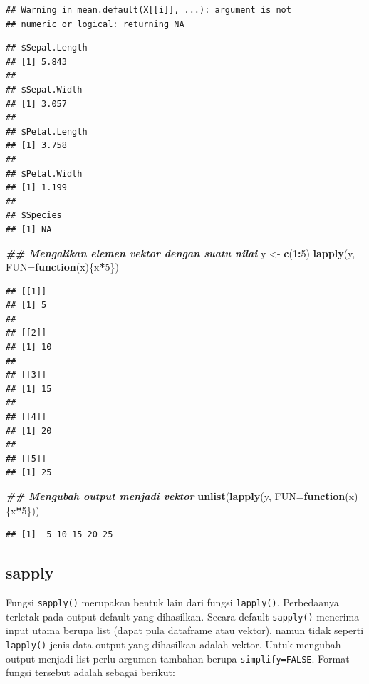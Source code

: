 \documentclass[
]{book}
\newenvironment{Shaded}{\begin{snugshade}}{\end{snugshade}}
\newcommand{\AttributeTok}[1]{\textcolor[rgb]{0.13,0.29,0.53}{#1}}
\newcommand{\ControlFlowTok}[1]{\textcolor[rgb]{0.13,0.29,0.53}{\textbf{#1}}}
\newcommand{\DecValTok}[1]{\textcolor[rgb]{0.00,0.00,0.81}{#1}}
\newcommand{\DocumentationTok}[1]{\textcolor[rgb]{0.56,0.35,0.01}{\textbf{\textit{#1}}}}
\newcommand{\FunctionTok}[1]{\textcolor[rgb]{0.13,0.29,0.53}{\textbf{#1}}}
\newcommand{\NormalTok}[1]{#1}
\newcommand{\OtherTok}[1]{\textcolor[rgb]{0.56,0.35,0.01}{#1}}
\newcommand{\SpecialCharTok}[1]{\textcolor[rgb]{0.81,0.36,0.00}{\textbf{#1}}}
\theoremstyle{definition}
\theoremstyle{definition}
\theoremstyle{definition}
\theoremstyle{definition}
\theoremstyle{remark}
\begin{document}
\begin{verbatim}
## Warning in mean.default(X[[i]], ...): argument is not
## numeric or logical: returning NA
\end{verbatim}

\begin{verbatim}
## $Sepal.Length
## [1] 5.843
## 
## $Sepal.Width
## [1] 3.057
## 
## $Petal.Length
## [1] 3.758
## 
## $Petal.Width
## [1] 1.199
## 
## $Species
## [1] NA
\end{verbatim}

\begin{Shaded}
\begin{Highlighting}[]
\DocumentationTok{\#\# Mengalikan elemen vektor dengan suatu nilai}
\NormalTok{y }\OtherTok{\textless{}{-}} \FunctionTok{c}\NormalTok{(}\DecValTok{1}\SpecialCharTok{:}\DecValTok{5}\NormalTok{)}
\FunctionTok{lapply}\NormalTok{(y, }\AttributeTok{FUN=}\ControlFlowTok{function}\NormalTok{(x)\{x}\SpecialCharTok{*}\DecValTok{5}\NormalTok{\})}
\end{Highlighting}
\end{Shaded}

\begin{verbatim}
## [[1]]
## [1] 5
## 
## [[2]]
## [1] 10
## 
## [[3]]
## [1] 15
## 
## [[4]]
## [1] 20
## 
## [[5]]
## [1] 25
\end{verbatim}

\begin{Shaded}
\begin{Highlighting}[]
\DocumentationTok{\#\# Mengubah output menjadi vektor}
\FunctionTok{unlist}\NormalTok{(}\FunctionTok{lapply}\NormalTok{(y, }\AttributeTok{FUN=}\ControlFlowTok{function}\NormalTok{(x)\{x}\SpecialCharTok{*}\DecValTok{5}\NormalTok{\}))}
\end{Highlighting}
\end{Shaded}

\begin{verbatim}
## [1]  5 10 15 20 25
\end{verbatim}

\hypertarget{sapply}{%
\subsection{sapply}\label{sapply}}

Fungsi \texttt{sapply()} merupakan bentuk lain dari fungsi \texttt{lapply()}. Perbedaanya terletak pada output default yang dihasilkan. Secara default \texttt{sapply()} menerima input utama berupa list (dapat pula dataframe atau vektor), namun tidak seperti \texttt{lapply()} jenis data output yang dihasilkan adalah vektor. Untuk mengubah output menjadi list perlu argumen tambahan berupa \texttt{simplify=FALSE}. Format fungsi tersebut adalah sebagai berikut:
\end{document}
